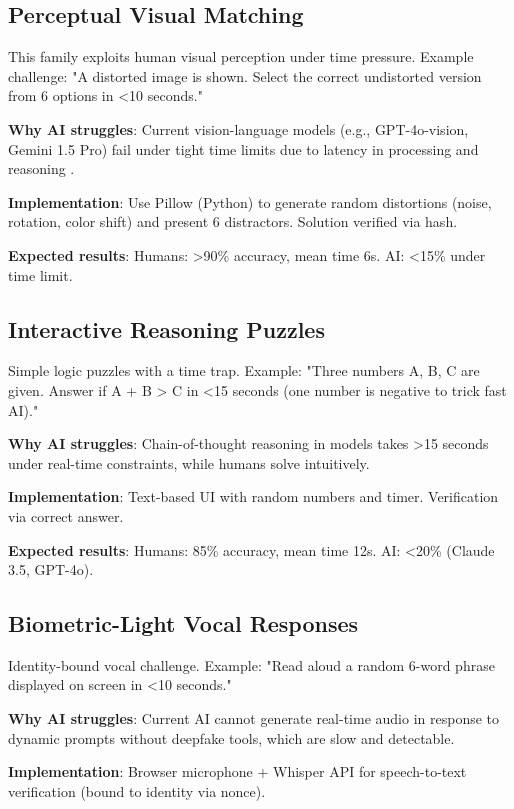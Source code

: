 \documentclass[sigconf,nonacm]{acmart}
\begin{document}
\subsection{Perceptual Visual Matching}

This family exploits human visual perception under time pressure. Example challenge: "A distorted image is shown. Select the correct undistorted version from 6 options in <10 seconds."

\textbf{Why AI struggles}: Current vision-language models (e.g., GPT-4o-vision, Gemini 1.5 Pro) fail under tight time limits due to latency in processing and reasoning \cite{geirhos2018generalisation}.

\textbf{Implementation}: Use Pillow (Python) to generate random distortions (noise, rotation, color shift) and present 6 distractors. Solution verified via hash.

\textbf{Expected results}: Humans: >90\% accuracy, mean time 6s. AI: <15\% under time limit.

\subsection{Interactive Reasoning Puzzles}

Simple logic puzzles with a time trap. Example: "Three numbers A, B, C are given. Answer if A + B > C in <15 seconds (one number is negative to trick fast AI)."

\textbf{Why AI struggles}: Chain-of-thought reasoning in models takes >15 seconds under real-time constraints, while humans solve intuitively.

\textbf{Implementation}: Text-based UI with random numbers and timer. Verification via correct answer.

\textbf{Expected results}: Humans: 85\% accuracy, mean time 12s. AI: <20\% (Claude 3.5, GPT-4o).

\subsection{Biometric-Light Vocal Responses}

Identity-bound vocal challenge. Example: "Read aloud a random 6-word phrase displayed on screen in <10 seconds."

\textbf{Why AI struggles}: Current AI cannot generate real-time audio in response to dynamic prompts without deepfake tools, which are slow and detectable.

\textbf{Implementation}: Browser microphone + Whisper API for speech-to-text verification (bound to identity via nonce).
\end{document}
